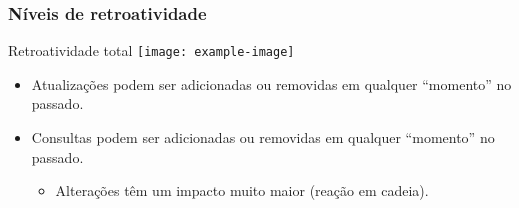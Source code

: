     \begin{frame}
        \frametitle{Níveis de retroatividade}

        \begin{block}{Retroatividade total}
            \centering
            \texttt{[image: example-image]}
        \end{block}

        \begin{itemize}
            \item<1-> Atualizações podem ser adicionadas ou removidas em qualquer ``momento'' no passado.
            \item<2-> Consultas podem ser adicionadas ou removidas em qualquer ``momento'' no passado.
            \begin{itemize}
                \item<3-> Alterações têm um impacto muito maior (reação em cadeia).
            \end{itemize}
        \end{itemize}

    \end{frame}